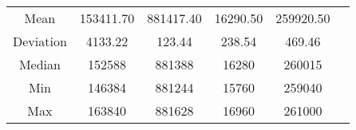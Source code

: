 \begin{table}[!ht]
{{\begin{tabular}{c|cc|cc|c}
                \multicolumn{1}{c|}{Mean}      & 153411.70                                           & 881417.40                               & 16290.50  & 259920.50 & \multicolumn{1}{l}{}                                                                                  \\ \cline{1-6}
                \multicolumn{1}{c|}{Deviation} & 4133.22                                             & 123.44                                  & 238.54    & 469.46    & \multicolumn{1}{l}{}                                                                                  \\ \cline{1-6}
                \multicolumn{1}{c|}{Median}    & 152588                                              & 881388                                  & 16280     & 260015    & \multicolumn{1}{l}{}                                                                                  \\ \cline{1-6}
                \multicolumn{1}{c|}{Min}       & 146384                                              & 881244                                  & 15760     & 259040    & \multicolumn{1}{l}{}                                                                                  \\ \cline{1-6}
                \multicolumn{1}{c|}{Max}       & 163840                                              & 881628                                  & 16960     & 261000    & \multicolumn{1}{l}{\parbox[t]{1em}{}}  \\ \hline


\end{tabular}}}
\end{table}
